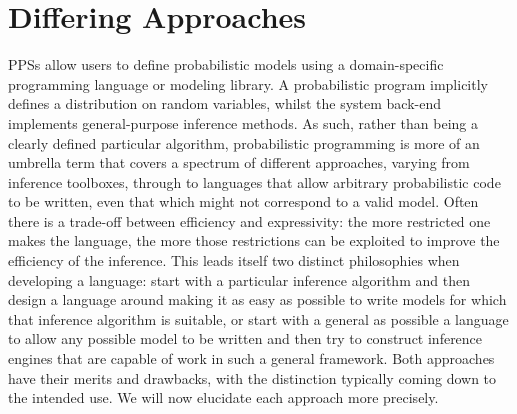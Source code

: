 
\section{Differing Approaches}
\label{sec:probprog:two}

PPSs allow users to define probabilistic models 
using a domain-specific programming language or modeling library. A probabilistic program implicitly 
defines a distribution on random variables, whilst the system back-end implements 
general-purpose inference methods.  As such, rather than being a clearly defined particular algorithm,
probabilistic programming is more of an umbrella term that covers a spectrum of 
different approaches, varying from inference toolboxes, through to languages that allow
arbitrary probabilistic code to be written, even that which might not correspond to a valid
model.  Often there is a trade-off between efficiency and expressivity: the more restricted
one makes the language, the more those restrictions can be exploited to improve the efficiency
of the inference.  This leads itself two distinct philosophies when developing a language: 
start with a particular inference algorithm and then design a language around making it as
easy as possible to write models for which that inference algorithm is suitable, or start with a
general as possible a language to allow any possible model to be written and then try to construct
inference engines that are capable of work in such a general framework.  Both approaches 
have their merits and drawbacks, with the distinction typically coming down to the intended use.
We will now elucidate each approach more precisely.  

